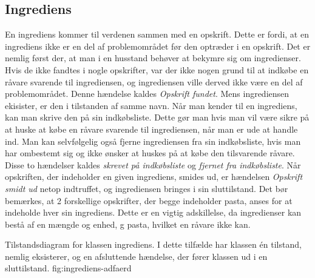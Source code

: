 \subsection{Ingrediens}

En ingrediens kommer til verdenen sammen med en opskrift. Dette er fordi, at en ingrediens ikke er en del af problemområdet før den optræder i en opskrift. Det er nemlig først der, at man i en husstand behøver at bekymre sig om ingredienser. Hvis de ikke fandtes i nogle opskrifter, var der ikke nogen grund til at indkøbe en råvare svarende til ingrediensen, og ingrediensen ville derved ikke være en del af problemområdet. Denne hændelse kaldes \textit{Opskrift fundet}. Mens ingrediensen ekisister, er den i tilstanden af samme navn. Når man kender til en ingrediens, kan man skrive den på sin indkøbsliste. Dette gør man hvis man vil være sikre på at huske at købe en råvare svarende til ingrediensen, når man er ude at handle ind. Man kan selvfølgelig også fjerne ingrediensen fra sin indkøbsliste, hvis man har ombestemt sig og ikke ønsker at huskes på at købe den tilsvarende råvare. Disse to hændelser kaldes \textit{skrevet på indkøbsliste} og \textit{fjernet fra indkøbsliste}. Når opskriften, der indeholder en given ingrediens, smides ud, er hændelsen \textit{Opskrift smidt ud} netop indtruffet, og ingrediensen bringes i sin sluttilstand. Det bør bemærkes, at 2 forskellige opskrifter, der begge indeholder pasta, anses for at indeholde hver sin ingrediens. Dette er en vigtig adskillelse, da ingredienser kan bestå af en mængde og enhed,  g pasta, hvilket en råvare ikke kan.

  {Tilstandsdiagram for klassen ingrediens. I dette tilfælde har klassen én tilstand, nemlig eksisterer, og en afsluttende hændelse, der fører klassen ud i en sluttilstand.}
  {fig:ingrediens-adfaerd}
